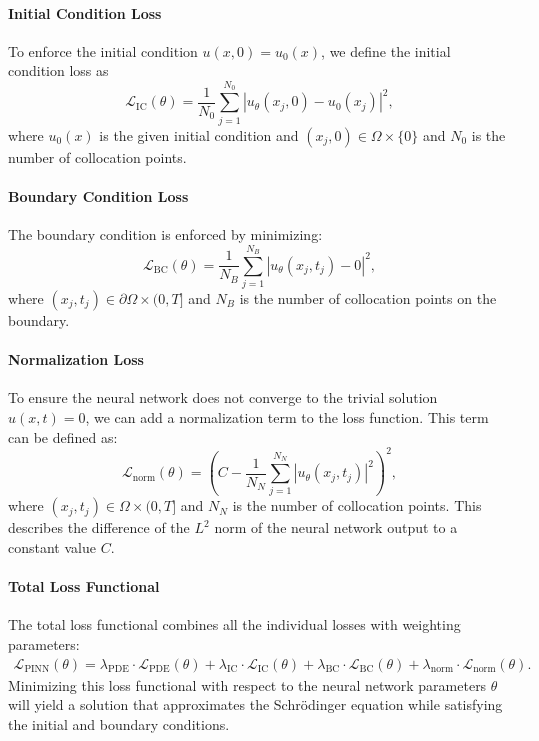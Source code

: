 \documentclass{article}
\theoremstyle{definition}
\theoremstyle{plain}
\theoremstyle{remark}
\begin{document}
\paragraph{Initial Condition Loss}
To enforce the initial condition \( u(x,0) = u_0(x) \), we define the initial condition loss as
\[\mathcal{L}_{\mathrm{IC}}(\theta) = \frac{1}{N_0} \sum_{j=1}^{N_0} \left| u_\theta(x_j, 0) - u_0(x_j) \right|^2,\]
where \( u_0(x) \) is the given initial condition and \( (x_j, 0) \in \Omega \times \{0\} \) and \( N_0 \) is the number of collocation points.

\paragraph{Boundary Condition Loss}
The boundary condition is enforced by minimizing:
\[\mathcal{L}_{\mathrm{BC}}(\theta) = \frac{1}{N_B} \sum_{j=1}^{N_B} \left| u_\theta(x_j, t_j) - 0 \right|^2,\]
where \( (x_j, t_j) \in \partial \Omega \times (0,T] \) and \( N_B \) is the number of collocation points on the boundary.

\paragraph{Normalization Loss}
To ensure the neural network does not converge to the trivial solution \( u(x,t) = 0 \), we can add a normalization term to the loss function. 
This term can be defined as:
\[\mathcal{L}_{\mathrm{norm}}(\theta) = \left(C - \frac{1}{N_N} \sum_{j=1}^{N_N} \left|  u_\theta(x_j, t_j) \right|^2\right)^2,\]
where \( (x_j, t_j) \in \Omega \times (0,T] \) and \( N_N \) is the number of collocation points.
This describes the difference of the $L^2$ norm of the neural network output to a constant value $C$.

\paragraph{Total Loss Functional}
The total loss functional combines all the individual losses with weighting parameters:
\begin{align*}
\mathcal{L}_{\mathrm{PINN}}(\theta) =
\lambda_{\mathrm{PDE}} \cdot \mathcal{L}_{\mathrm{PDE}}(\theta) +
\lambda_{\mathrm{IC}} \cdot \mathcal{L}_{\mathrm{IC}}(\theta) +
\lambda_{\mathrm{BC}} \cdot \mathcal{L}_{\mathrm{BC}}(\theta) +
\lambda_{\mathrm{norm}} \cdot \mathcal{L}_{\mathrm{norm}}(\theta).
\end{align*}
Minimizing this loss functional with respect to the neural network parameters \( \theta \) will yield a solution that approximates the Schrödinger equation while satisfying the initial and boundary conditions.
\end{document}
